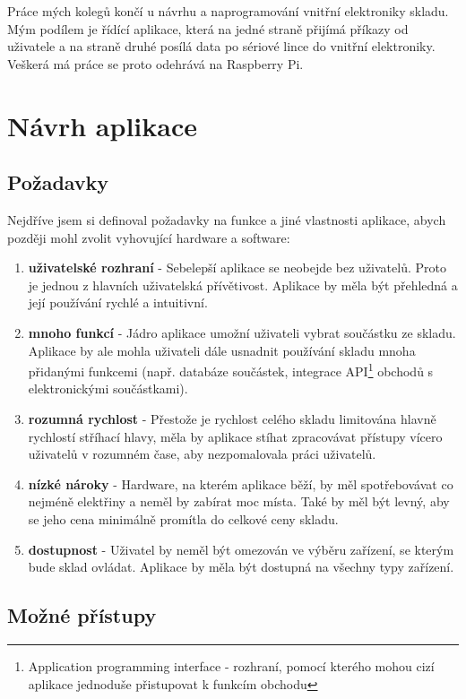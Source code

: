 \documentclass[12pt, a4paper, oneside]{article}
\begin{document}
Práce mých kolegů končí u návrhu a naprogramování vnitřní elektroniky skladu. Mým podílem je řídící aplikace, která na jedné straně přijímá příkazy od uživatele a na straně druhé posílá data po sériové lince do vnitřní elektroniky. Veškerá má práce se proto odehrává na Raspberry Pi.

\newpage

\section{Návrh aplikace}

\subsection{Požadavky}

Nejdříve jsem si definoval požadavky na funkce a jiné vlastnosti aplikace, abych později mohl zvolit vyhovující hardware a software:

\begin{enumerate}
\item \textbf{uživatelské rozhraní} - Sebelepší aplikace se neobejde bez uživatelů. Proto je jednou z hlavních uživatelská přívětivost. Aplikace by měla být přehledná a její používání rychlé a intuitivní.
\item \textbf{mnoho funkcí} - Jádro aplikace umožní uživateli vybrat součástku ze skladu. Aplikace by ale mohla uživateli dále usnadnit používání skladu mnoha přidanými funkcemi (např. databáze součástek, integrace API\footnote{Application programming interface - rozhraní, pomocí kterého mohou cizí aplikace jednoduše přistupovat k funkcím obchodu} obchodů s elektronickými součástkami).
\item \textbf{rozumná rychlost} - Přestože je rychlost celého skladu limitována hlavně rychlostí stříhací hlavy, měla by aplikace stíhat zpracovávat přístupy vícero uživatelů v rozumném čase, aby nezpomalovala práci uživatelů.
\item \textbf{nízké nároky} - Hardware, na kterém aplikace běží, by měl spotřebovávat co nejméně elektřiny a neměl by zabírat moc místa. Také by měl být levný, aby se jeho cena minimálně promítla do celkové ceny skladu.
\item \textbf{dostupnost} - Uživatel by neměl být omezován ve výběru zařízení, se kterým bude sklad ovládat. Aplikace by měla být dostupná na všechny typy zařízení.
\end{enumerate}

\subsection{Možné přístupy}
\end{document}
